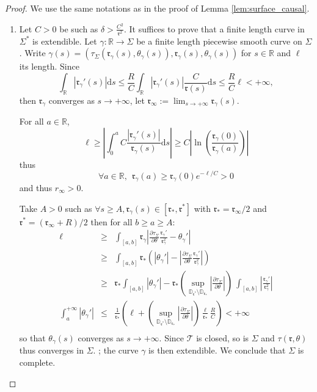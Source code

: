 \documentclass[a4paper,12pt]{article}
\def\r{\mathfrak{r}}
\def\R{\mathbb{R}}
\def\T{\mathcal{T}}
\def\d{\mathrm{d}}
\begin{document}
      \begin{proof}We use the same notations as in the proof of Lemma \ref{lem:surface_causal}. 
      \begin{enumerate}
       \item

      Let $C>0$  be such as $\delta>\frac{C^2}{\r^2}$. 
      It suffices to prove that a finite length curve in $\Sigma^*$ is extendible.
      Let $\gamma:\R\rightarrow \Sigma$ be  a finite length piecewise smooth curve on 
      $\Sigma$. Write $\gamma(s)=(\tau_\Sigma(\r_\gamma(s),\theta_\gamma(s)),\r_\gamma(s),\theta_\gamma(s))$ for $s\in \R$ and $\ell$ its length.
      Since $$\int_{\R} |\r_\gamma'(s)| \d s\leq \frac{R}{C} \int_{\R} |\r_\gamma'(s)|\frac{C}{\r(s)}\d s \leq \frac{R}{C} \ell <+\infty,$$ 
      then  $\r_\gamma$ converges as $s\rightarrow +\infty$, let
         $\r_\infty:= \lim_{s\rightarrow +\infty} \r_\gamma(s)$. 
      
      For all $a\in \R$, 
      $$\ell \geq \left|\int_0^a C\frac{|\r_\gamma'(s)|}{\r_\gamma(s)}\d s \right|\geq C \left|\ln\left(\frac{\r_\gamma(0)}{\r_\gamma(a)}\right) \right|$$ 
      thus $$\forall a \in \R, ~~\r_\gamma(a)\geq \r_\gamma(0) e^{-\ell/C}>0$$ and thus $r_\infty>0$. 
 
      Take $A >0$ such as $\forall s\geq A, \r_\gamma(s)\in [\r_*,\r^*]$ with $\r_*=\r_\infty/2$ and $\r^*=(\r_\infty+R)/2$
      then for all $b\geq a \geq  A$:
      \begin{eqnarray*}\ell&\geq& \int_{[a,b]} \r_\gamma \left|\frac{\partial \tau_\Sigma}{\partial \theta}\frac{\r_\gamma'}{\r_\gamma^2}-\theta_\gamma' \right| \\
	&\geq&  \int_{[a,b]} \r_*\left(\left|\theta_\gamma' \right|-\left|\frac{\partial \tau_\Sigma}{\partial \theta}\frac{\r_\gamma'}{\r_\gamma^2}\right|\right)\\
	&\geq&  \r_*\int_{[a,b]}
	  \left|\theta_\gamma' \right|
	    -\r_*
	    \left(\sup_{ \mathbb D_{\r^*}\setminus \mathbb D_{\r_*}}\left|\frac{\partial \tau_\Sigma}{\partial \theta}\right|\right) \  
	    \int_{[a,b]}\left|\frac{\r_\gamma'}{\r_\gamma^2}\right|   \\
 \int_{a}^{+\infty}|\theta_\gamma'| &\leq& \frac{1}{\r_*}\left(\ell+\left(\sup_{ \mathbb D_{\r^*}\setminus \mathbb D_{\r_*}}\left|\frac{\partial \tau_\Sigma}{\partial \theta}\right|\right) \frac{\ell}{\r_*} \frac{R}{C} \right)< +\infty
 \\
      \end{eqnarray*}
    so that $\theta_\gamma(s)$ converges as $s\rightarrow +\infty$. 
	Since $\T$ is closed, so is $\Sigma$ and $\tau(\r,\theta)$ thus converges in $\Sigma$. 
	; the curve $\gamma$ is then extendible.
	We conclude that $\Sigma$ is complete.


\end{enumerate}
\end{proof}
\end{document}
